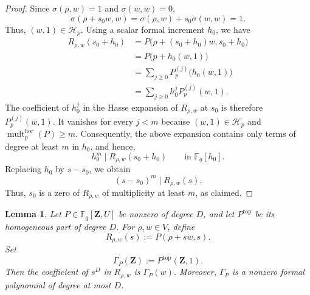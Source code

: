\documentclass[11pt,letterpaper]{amsart}
\numberwithin{equation}{section}
\newtheorem{lemma}[lemma]{Lemma}
\theoremstyle{definition}
\theoremstyle{remark}
\newcommand{\Fq}{\mathbb F_q}
\begin{document}
\begin{proof}

Since $\sigma(\rho,w)=1$ and $\sigma(w,w)=0$,
\[
 \sigma(\rho+s_0w,w)
 =
 \sigma(\rho,w)+s_0\sigma(w,w)
 =1.
\]
Thus, $(w,1)\in\mathcal H_p$.  Using a scalar formal increment $h_0$, we have
\begin{align*}
 R_{\rho,w}(s_0+h_0)
 &=P\bigl(\rho+(s_0+h_0)w,s_0+h_0\bigr)\\
 &=P\bigl(p+h_0(w,1)\bigr)\\
 &=\sum_{j\geq0}P_p^{(j)}\bigl(h_0(w,1)\bigr)\\
 &=\sum_{j\geq0}h_0^jP_p^{(j)}(w,1).
\end{align*}
The coefficient of $h_0^j$ in the Hasse expansion of $R_{\rho,w}$ at $s_0$ is therefore $P_p^{(j)}(w,1)$. It vanishes for every $j<m$ because
$(w,1)\in\mathcal H_p$ and $\operatorname{mult}^{\mathrm{hor}}_p(P)\geq m$. Consequently, the above expansion contains only terms of degree at least $m$ in $h_0$, and hence,
\[
 h_0^m\mid R_{\rho,w}(s_0+h_0)
 \qquad\text{in }\Fq[h_0].
\]
Replacing $h_0$ by $s-s_0$, we obtain
\[
 (s-s_0)^m\mid R_{\rho,w}(s).
\]
Thus, $s_0$ is a zero of $R_{\rho,w}$ of multiplicity at least $m$, as
claimed.
\end{proof}

\begin{lemma}
\label{lem:leading-term-on-line}
Let $P\in\Fq[\mathbf Z,U]$ be nonzero of degree $D$, and let
$P^{\mathrm{top}}$ be its homogeneous part of degree $D$. For
$\rho,w\in V$, define
\[
 R_{\rho,w}(s):=P(\rho+sw,s).
\]
Set
\[
 \Gamma_P(\mathbf Z):=P^{\mathrm{top}}(\mathbf Z,1).
\]
Then the coefficient of $s^D$ in $R_{\rho,w}$ is $\Gamma_P(w)$.
Moreover, $\Gamma_P$ is a nonzero formal polynomial of degree at most $D$. 
\end{lemma}
\end{document}
